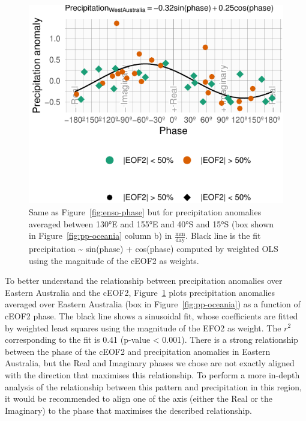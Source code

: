 \documentclass[smallextended]{svjour3}       %
\begin{document}
\begin{figure}
\centering
\includegraphics{../figures/australia-pp-phase-1.pdf}
\caption{\label{fig:australia-pp-phase}Same as Figure~\ref{fig:enso-phase} but for precipitation anomalies averaged between 130°E and 155°E and 40°S and 15°S (box shown in Figure~\ref{fig:pp-oceania} column b) in \(\frac{\mathrm{mm}}{\mathrm{day}}\).
Black line is the fit precipitation \textasciitilde{} sin(phase) + cos(phase) computed by weighted OLS using the magnitude of the cEOF2 as weights.}
\end{figure}

To better understand the relationship between precipitation anomalies over Eastern Australia and the cEOF2, Figure~\ref{fig:australia-pp-phase} plots precipitation anomalies averaged over Eastern Australia (box in Figure~\ref{fig:pp-oceania}) as a function of cEOF2 phase.
The black line shows a sinusoidal fit, whose coefficients are fitted by weighted least squares using the magnitude of the EFO2 as weight.
The \(r^2\) corresponding to the fit is 0.41 (p-value \textless{} 0.001).
There is a strong relationship between the phase of the cEOF2 and precipitation anomalies in Eastern Australia, but the Real and Imaginary phases we chose are not exactly aligned with the direction that maximises this relationship.
To perform a more in-depth analysis of the relationship between this pattern and precipitation in this region, it would be recommended to align one of the axis (either the Real or the Imaginary) to the phase that maximises the described relationship.
\end{document}
